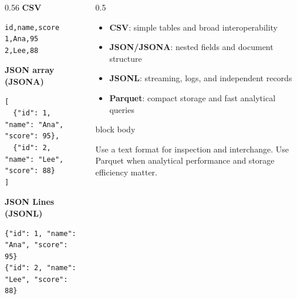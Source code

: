\documentclass[11pt,aspectratio=43]{beamer}
\begin{document}
{  \begin{frame}[fragile]{}
    \begin{columns}[T,onlytextwidth]
      \begin{column}{0.56\textwidth}
        \textbf{CSV}
        \begin{lstlisting}
id,name,score
1,Ana,95
2,Lee,88
        \end{lstlisting}

        \textbf{JSON array (JSONA)}
        \begin{lstlisting}
[
  {"id": 1, "name": "Ana", "score": 95},
  {"id": 2, "name": "Lee", "score": 88}
]
        \end{lstlisting}

        \textbf{JSON Lines (JSONL)}
        \begin{lstlisting}
{"id": 1, "name": "Ana", "score": 95}
{"id": 2, "name": "Lee", "score": 88}
        \end{lstlisting}
      \end{column}

      \begin{column}{0.5\textwidth}
        \begin{itemize}
          \item \textbf{CSV}: simple tables and broad interoperability
          \item \textbf{JSON/JSONA}: nested fields and document structure
          \item \textbf{JSONL}: streaming, logs, and independent records
          \item \textbf{Parquet}: compact storage and fast analytical queries
        \end{itemize}

        \vspace{0.1cm}
        \begin{beamercolorbox}[sep=8pt,rounded=true]{block body}
          \textbf{}\par
          Use a text format for inspection and interchange. Use Parquet when analytical performance and storage efficiency matter.
        \end{beamercolorbox}
      \end{column}
    \end{columns}
  \end{frame}
}
\end{document}
